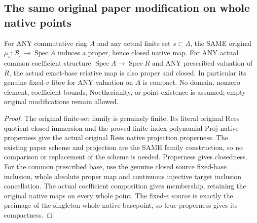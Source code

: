 \subsection{The same original paper modification on whole native points}

\begin{theorem}
\label{scheme:paper-rees-native-proper}
\leanok
{}
For ANY commutative ring $A$ and any actual finite set $s\subset A$, the
SAME original $\mu_s:\mathcal B_s\to\operatorname{Spec}A$ induces a proper,
hence closed native map. For ANY actual common coefficient structure
$\operatorname{Spec}A\to\operatorname{Spec}R$ and ANY prescribed valuation
of $R$, the actual exact-base relative map is also proper and closed.
In particular its genuine fixed-$v$ fibre for ANY valuation on $A$ is compact.
No domain, nonzero element, coefficient bounds, Noetherianity, or point
existence is assumed; empty original modifications remain allowed.
\end{theorem}
\begin{proof}
The original finite-set family is genuinely finite. Its literal original
Rees quotient closed immersion and the proved finite-index polynomial-Proj
native properness give the actual original Rees native projection properness.
The existing paper scheme and projection are the SAME family construction,
so no comparison or replacement of the scheme is needed. Properness gives
closedness. For the common prescribed base, use the genuine closed source
fixed-base inclusion, whole absolute proper map and continuous injective
target inclusion cancellation. The actual coefficient composition gives
membership, retaining the original native maps on every whole point.
The fixed-$v$ source is exactly the preimage of the singleton whole native
basepoint, so true properness gives its compactness.
\end{proof}

